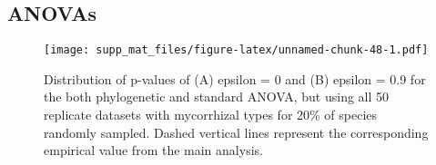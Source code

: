 \documentclass[]{article}
\begin{document}
\pagebreak

\hypertarget{anovas}{%
\subsection{ANOVAs}\label{anovas}}

\begin{figure}
\centering
\texttt{[image: supp\_mat\_files/figure-latex/unnamed-chunk-48-1.pdf]}
\caption{Distribution of p-values of (A) epsilon = 0 and (B) epsilon =
0.9 for the both phylogenetic and standard ANOVA, but using all 50
replicate datasets with mycorrhizal types for 20\% of species randomly
sampled. Dashed vertical lines represent the corresponding empirical
value from the main analysis.}
\end{figure}
\end{document}
